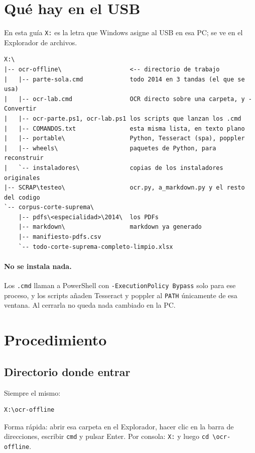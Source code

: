 ﻿\documentclass[11pt,a4paper]{article}
\begin{document}
\section{Qué hay en el USB}

En esta guía \texttt{X:} es la letra que Windows asigne al USB en esa PC; se ve en el
Explorador de archivos.

\begin{lstlisting}
X:\
|-- ocr-offline\                   <-- directorio de trabajo
|   |-- parte-sola.cmd             todo 2014 en 3 tandas (el que se usa)
|   |-- ocr-lab.cmd                OCR directo sobre una carpeta, y -Convertir
|   |-- ocr-parte.ps1, ocr-lab.ps1 los scripts que lanzan los .cmd
|   |-- COMANDOS.txt               esta misma lista, en texto plano
|   |-- portable\                  Python, Tesseract (spa), poppler
|   |-- wheels\                    paquetes de Python, para reconstruir
|   `-- instaladores\              copias de los instaladores originales
|-- SCRAP\testeo\                  ocr.py, a_markdown.py y el resto del codigo
`-- corpus-corte-suprema\
    |-- pdfs\<especialidad>\2014\  los PDFs
    |-- markdown\                  markdown ya generado
    |-- manifiesto-pdfs.csv
    `-- todo-corte-suprema-completo-limpio.xlsx
\end{lstlisting}

\paragraph{No se instala nada.} Los \texttt{.cmd} llaman a PowerShell con
\texttt{-ExecutionPolicy Bypass} solo para ese proceso, y los scripts añaden Tesseract y
poppler al \texttt{PATH} únicamente de esa ventana. Al cerrarla no queda nada cambiado en
la PC.

\section{Procedimiento}

\subsection{Directorio donde entrar}

Siempre el mismo:
\begin{lstlisting}
X:\ocr-offline
\end{lstlisting}
Forma rápida: abrir esa carpeta en el Explorador, hacer clic en la barra de direcciones,
escribir \texttt{cmd} y pulsar Enter. Por consola: \texttt{X:} y luego
\texttt{cd \textbackslash ocr-offline}.
\end{document}
